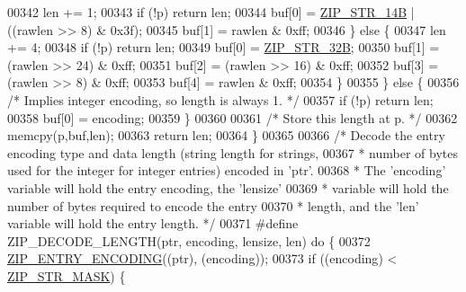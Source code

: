 \begin{DoxyCode}
{00342             len += 1;
00343             \textcolor{keywordflow}{if} (!p) \textcolor{keywordflow}{return} len;
00344             buf[0] = \hyperlink{ziplist_8c_a755263ebd8d5ac7daf2cc479e3cde7a0}{ZIP\_STR\_14B} | ((rawlen >> 8) & 0x3f);
00345             buf[1] = rawlen & 0xff;
00346         \} \textcolor{keywordflow}{else} \{
00347             len += 4;
00348             \textcolor{keywordflow}{if} (!p) \textcolor{keywordflow}{return} len;
00349             buf[0] = \hyperlink{ziplist_8c_a40174f4ec7db11cdaaab4d6387e0a79e}{ZIP\_STR\_32B};
00350             buf[1] = (rawlen >> 24) & 0xff;
00351             buf[2] = (rawlen >> 16) & 0xff;
00352             buf[3] = (rawlen >> 8) & 0xff;
00353             buf[4] = rawlen & 0xff;
00354         \}
00355     \} \textcolor{keywordflow}{else} \{
00356         \textcolor{comment}{/* Implies integer encoding, so length is always 1. */}
00357         \textcolor{keywordflow}{if} (!p) \textcolor{keywordflow}{return} len;
00358         buf[0] = encoding;
00359     \}
00360 
00361     \textcolor{comment}{/* Store this length at p. */}
00362     memcpy(p,buf,len);
00363     \textcolor{keywordflow}{return} len;
00364 \}
00365 
00366 \textcolor{comment}{/* Decode the entry encoding type and data length (string length for strings,}
00367 \textcolor{comment}{ * number of bytes used for the integer for integer entries) encoded in 'ptr'.}
00368 \textcolor{comment}{ * The 'encoding' variable will hold the entry encoding, the 'lensize'}
00369 \textcolor{comment}{ * variable will hold the number of bytes required to encode the entry}
00370 \textcolor{comment}{ * length, and the 'len' variable will hold the entry length. */}
00371 \textcolor{preprocessor}{#}\textcolor{preprocessor}{define} \textcolor{preprocessor}{ZIP\_DECODE\_LENGTH}\textcolor{preprocessor}{(}\textcolor{preprocessor}{ptr}\textcolor{preprocessor}{,} \textcolor{preprocessor}{encoding}\textcolor{preprocessor}{,} \textcolor{preprocessor}{lensize}\textcolor{preprocessor}{,} \textcolor{preprocessor}{len}\textcolor{preprocessor}{)} \textcolor{keywordflow}{do} \textcolor{preprocessor}{\{}
00372     \hyperlink{ziplist_8c_aec82eca55c364327e705c74e6e636585}{ZIP\_ENTRY\_ENCODING}\textcolor{preprocessor}{(}\textcolor{preprocessor}{(}\textcolor{preprocessor}{ptr}\textcolor{preprocessor}{)}\textcolor{preprocessor}{,} \textcolor{preprocessor}{(}\textcolor{preprocessor}{encoding}\textcolor{preprocessor}{)}\textcolor{preprocessor}{)}\textcolor{preprocessor}{;}
00373     \textcolor{keywordflow}{if} \textcolor{preprocessor}{(}\textcolor{preprocessor}{(}\textcolor{preprocessor}{encoding}\textcolor{preprocessor}{)} \textcolor{preprocessor}{<} \hyperlink{ziplist_8c_a8e8a0c4c5531ab6885734f42c1fb4398}{ZIP\_STR\_MASK}\textcolor{preprocessor}{)} \textcolor{preprocessor}{\{}
}
\end{DoxyCode}

